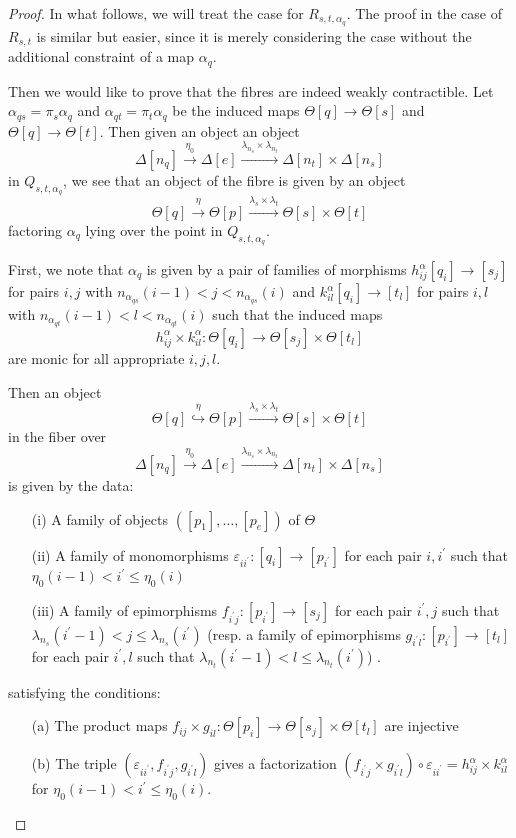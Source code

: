 \begin{proof}
In what follows, we will treat the case for \(R_{s,t,\alpha_q}\).  The proof in the case of \(R_{s,t}\) is similar but easier, since it is merely considering the case without the additional constraint of a map \(\alpha_q\).  

Then we would like to prove that the fibres are indeed weakly contractible. Let \(\alpha_{qs}=\pi_s\alpha_q\) and \(\alpha_{qt}=\pi_t\alpha_q\) be the induced maps \(\Theta[q]\to \Theta[s]\) and \(\Theta[q]\to \Theta[t]\).   Then given an object an object \[\Delta[n_q]\xrightarrow{\eta_0} \Delta[e] \xrightarrow{\lambda_{n_s}\times \lambda_{n_t}} \Delta[n_t]\times \Delta[n_s]\] in  \(Q_{s,t,\alpha_q}\), we see that an object of the fibre is given by an object \[\Theta[q]\xrightarrow{\eta} \Theta[p] \xrightarrow{\lambda_s\times\lambda_t} \Theta[s]\times\Theta[t]\] factoring \(\alpha_q\) lying over the point in \(Q_{s,t,\alpha_q}\). 

First, we note that \(\alpha_q\) is given by a pair of families of morphisms \(h^\alpha_{ij}[q_i]\to [s_j]\) for pairs \(i,j\) with \(n_{\alpha_{qs}}(i-1)<j<n_{\alpha_{qs}}(i)\) and \(k^\alpha_{il}[q_i]\to [t_l]\) for pairs \(i,l\) with \(n_{\alpha_{qt}}(i-1)<l<n_{\alpha_{qt}}(i)\) such that the induced maps \[h^\alpha_{ij}\times k^\alpha_{il}: \Theta[q_i]\to \Theta[s_j]\times \Theta[t_l]\] are monic for all appropriate \(i,j,l\).    

Then an object \[\Theta[q]\overset{\eta}{\hookrightarrow} \Theta[p] \xrightarrow{\lambda_s\times\lambda_t} \Theta[s]\times\Theta[t]\] in the fiber over \[\Delta[n_q]\overset{\eta_0}{\to} \Delta[e] \xrightarrow{\lambda_{n_s}\times \lambda_{n_t}} \Delta[n_t]\times \Delta[n_s]\] is given by the data:
\begin{enumerate}
\item[(i)] A family of objects \(([p_1],\dots,[p_e])\) of \(\Theta\) 
\item[(ii)] A family of monomorphisms \(\varepsilon_{ii^\prime}: [q_i]\to [p_{i^\prime}]\) for each pair \(i,i^\prime\) such that \(\eta_0(i-1)< i^\prime\leq \eta_0(i)\)
\item[(iii)] A family of epimorphisms \(f_{i^\prime j}: [p_{i^\prime}]\to [s_j]\) for each pair \(i^\prime,j\) such that \(\lambda_{n_s}(i^\prime-1)<j\leq \lambda_{n_s}(i^\prime)\) (resp. a family of epimorphisms \(g_{i^\prime l}:[p_{i^\prime}]\to [t_l]\) for each pair \(i^\prime,l\) such that \(\lambda_{n_t}(i^\prime-1)<l\leq \lambda_{n_t}(i^\prime)\)) .
\end{enumerate}
satisfying the conditions:
\begin{enumerate}
\item[(a)] The product maps \(f_{ij}\times g_{il}:\Theta[p_i]\to \Theta[s_j]\times \Theta[t_l]\) are injective
\item[(b)] The triple \((\varepsilon_{ii^\prime}, f_{i^\prime j}, g_{i^\prime l})\) gives a factorization \((f_{i^\prime j}\times g_{i^\prime l}) \circ \varepsilon_{ii^\prime}=h^\alpha_{ij}\times k^\alpha_{il}\) for \(\eta_0(i-1)< i^\prime \leq \eta_0(i)\).  
\end{enumerate}


\end{proof}
